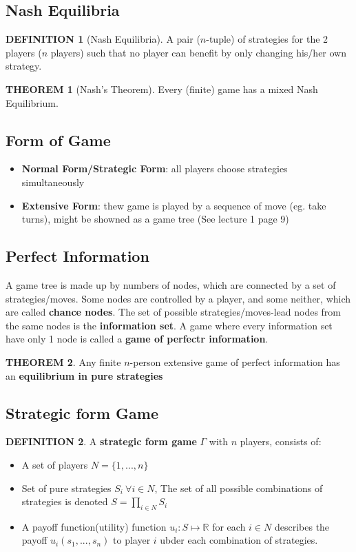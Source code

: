 \documentclass[12pt]{article}
\theoremstyle{definition}
\newtheorem*{definition}{DEFINITION}
\newtheorem*{theorem}{THEOREM}
\begin{document}
    \subsection*{Nash Equilibria}
        \begin{definition}[Nash Equilibria]
            A pair ($n$-tuple) of strategies for the 2 players ($n$ players) such that no player can benefit by only changing his/her own strategy.
        \end{definition}
        \begin{theorem}[Nash's Theorem]
            Every (finite) game has a mixed Nash Equilibrium.
        \end{theorem}
    
    \subsection*{Form of Game}
    \begin{itemize}
        \item \textbf{Normal Form/Strategic Form}: all players choose strategies simultaneously
        \item \textbf{Extensive Form}: thew game is played by a sequence of move (eg. take turns), might be showned as a game tree (See lecture 1 page 9)
    \end{itemize}

    \subsection*{Perfect Information}
    A game tree is made up by numbers of nodes, which are connected by a set of strategies/moves. Some nodes are controlled by a player, and some neither, which are called \textbf{chance nodes}. The set of possible strategies/moves-lead nodes from the same nodes is the \textbf{information set}. A game where every information set have only 1 node is called a \textbf{game of perfectr information}.
    \begin{theorem}
        Any finite $n$-person extensive game of perfect information has an \textbf{equilibrium in pure strategies}
    \end{theorem}

    \subsection*{Strategic form Game}
    \begin{definition}
        A \textbf{strategic form game} $\Gamma$ with $n$ players, consists of:
            \begin{itemize}
                \item A set of players $N = \{1,...,n\}$
                \item Set of pure strategies $S_i \ \forall i \in N$, The set of all possible combinations of strategies is denoted $S = \prod_{i\in N}S_i$
                \item A payoff function(utility) function $u_i:S\mapsto\mathbb{R}$ for each $i \in N$ describes the payoff $u_i(s_1,...,s_n)$ to player $i$ ubder each combination of strategies.
            \end{itemize}
    \end{definition}
\end{document}
